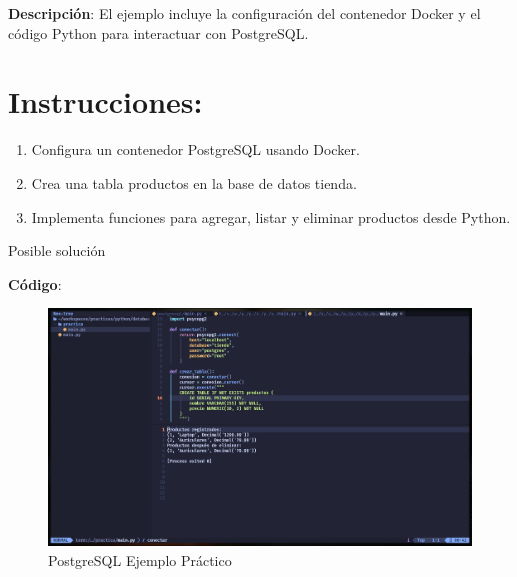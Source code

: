 \documentclass[
  a4paper,
  DIV=11,
  numbers=noendperiod,
  onepage,
  openany]{scrreprt}
\begin{document}
\textbf{Descripción}: El ejemplo incluye la configuración del contenedor
Docker y el código Python para interactuar con PostgreSQL.

\section{Instrucciones:}\label{instrucciones-9}

\begin{enumerate}
\def\labelenumi{\arabic{enumi}.}
\item
  Configura un contenedor PostgreSQL usando Docker.
\item
  Crea una tabla productos en la base de datos tienda.
\item
  Implementa funciones para agregar, listar y eliminar productos desde
  Python.
\end{enumerate}

Posible solución

\textbf{Código}:

\begin{figure}[H]

{\centering \includegraphics[width=8.33333in,height=\textheight,keepaspectratio]{unidades/unidad6/./images/postgresql_code005.png}

}

\caption{PostgreSQL Ejemplo Práctico}

\end{figure}%
\end{document}
